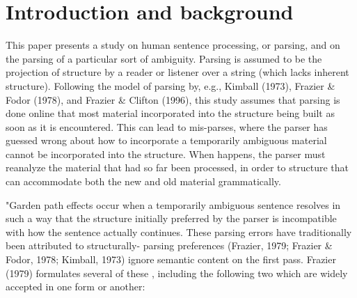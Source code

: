 \documentclass[12pt,oneside]{book}
\begin{document}
\pagebreak


\hypertarget{introduction-and-background}{%
\chapter{Introduction and background}\label{introduction-and-background}}


This paper presents a study on human sentence processing, or parsing, and on the parsing of a particular sort of ambiguity. Parsing is assumed to be the projection of structure by a reader or listener over a string  (which  lacks inherent structure). Following the  model of parsing  by, e.g., Kimball (1973), Frazier \& Fodor (1978), and Frazier \& Clifton (1996), this study assumes that parsing is done online   that most material  incorporated into the structure being built as soon as it is encountered. This can lead to mis-parses, where the parser has guessed wrong about how to incorporate a  temporarily ambiguous  material  cannot be incorporated into the  structure.  When  happens, the parser must reanalyze the material that had so far been processed, in order to  structure that can accommodate both the new and  old material grammatically. 

"Garden path effects occur when a temporarily ambiguous sentence resolves in such a way that the structure initially preferred by the parser is incompatible with how the sentence actually continues. These parsing errors have traditionally been attributed to structurally- parsing preferences (Frazier, 1979; Frazier \& Fodor, 1978; Kimball, 1973)  ignore semantic content on the first pass. Frazier (1979) formulates several of these , including the following two which are widely accepted in one form or another:
\end{document}
